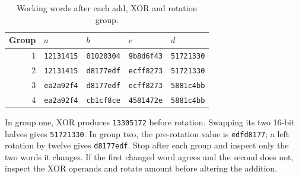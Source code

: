 \begin{table}[htbp]
  \centering\caption{Working words after each add, XOR and rotation group.}
  \begin{tabular}{rllll}\toprule
    Group & \(a\)             & \(b\)             & \(c\)             & \(d\)             \\\midrule
    1     & \texttt{12131415} & \texttt{01020304} & \texttt{9b8d6f43} & \texttt{51721330} \\
    2     & \texttt{12131415} & \texttt{d8177edf} & \texttt{ecff8273} & \texttt{51721330} \\
    3     & \texttt{ea2a92f4} & \texttt{d8177edf} & \texttt{ecff8273} & \texttt{5881c4bb} \\
    4     & \texttt{ea2a92f4} & \texttt{cb1cf8ce} & \texttt{4581472e} & \texttt{5881c4bb} \\
    \bottomrule\end{tabular}
\end{table}

In group one, XOR produces \texttt{13305172} before rotation. Swapping its two
16-bit halves gives \texttt{51721330}. In group two, the pre-rotation value is
\texttt{edfd8177}; a left rotation by twelve gives \texttt{d8177edf}. Stop after
each group and inspect only the two words it changes. If the first changed word
agrees and the second does not, inspect the XOR operands and rotate amount before
altering the addition.
